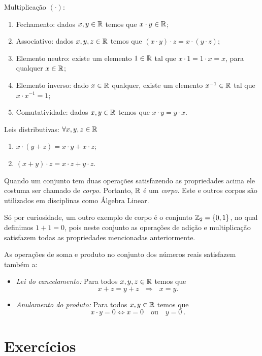   Multiplicação $(\cdot)$:
 \begin{enumerate}[1)]
 \item Fechamento: dados $x, y \in \mathbb{R}$ temos que $x \cdot y \in \mathbb{R}$;
 \item Associativo: dados $x, y, z \in \mathbb{R}$ temos que $(x \cdot y) \cdot z= x \cdot (y \cdot z)$;
 \item Elemento neutro: existe um elemento $1 \in \mathbb{R}$ tal que $x \cdot 1= 1 \cdot x= x$, para qualquer $x \in \mathbb{R}$;
 \item Elemento inverso: dado $x \in \mathbb{R}$ qualquer, existe um elemento $x^{-1} \in \mathbb{R}$ tal que $x \cdot x^{-1}= 1$;
 \item Comutatividade: dados $x, y \in \mathbb{R}$ temos que $x \cdot y= y \cdot x$.
 \end{enumerate}

  Leis distributivas: $\forall x, y, z \in \mathbb{R}$
 \begin{enumerate}[1)]
 \item $x \cdot (y + z)= x \cdot y + x \cdot z$;
 \item $(x + y) \cdot z= x \cdot z + y \cdot z$.
 \end{enumerate}

   Quando um conjunto tem duas operações satisfazendo as propriedades acima ele costuma ser chamado de \emph{corpo}. Portanto, $\mathbb{R}$ é um \emph{corpo}. Este e outros corpos são utilizados em disciplinas como Álgebra Linear.

   Só por curiosidade, um outro exemplo de corpo é o conjunto $\mathbb{Z}_2= \{0, 1\}$, no qual definimos $1+1=0$, pois neste conjunto as operações de adição e multiplicação satisfazem todas as propriedades mencionadas anteriormente.

   As operações de soma e produto no conjunto dos números reais satisfazem também a:
   \begin{itemize}
   \item \textit{Lei do cancelamento:} Para todos $x, y, z \in \mathbb{R}$  temos que
\begin{equation}
x+z=y+z \ \ \ \Rightarrow \ \ \ x=y  . 
\end{equation}
   \item \textit{Anulamento do produto:} Para todos $x, y \in \mathbb{R}$  temos que
\begin{equation}
x \cdot y= 0 \Leftrightarrow x=0 \ \ \ \text{ ou } \ \ \ y=0 \ .
\end{equation}
   \end{itemize}

\section{Exercícios}

